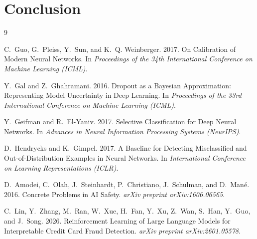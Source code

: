 \documentclass[sigconf,nonacm]{acmart}
\begin{document}
\section{Conclusion}


\begin{thebibliography}{9}

C.~Guo, G.~Pleiss, Y.~Sun, and K.~Q. Weinberger. 2017.
On Calibration of Modern Neural Networks.
In \textit{Proceedings of the 34th International Conference on Machine Learning (ICML)}.

Y.~Gal and Z.~Ghahramani. 2016.
Dropout as a Bayesian Approximation: Representing Model Uncertainty in Deep Learning.
In \textit{Proceedings of the 33rd International Conference on Machine Learning (ICML)}.

Y.~Geifman and R.~El-Yaniv. 2017.
Selective Classification for Deep Neural Networks.
In \textit{Advances in Neural Information Processing Systems (NeurIPS)}.

D.~Hendrycks and K.~Gimpel. 2017.
A Baseline for Detecting Misclassified and Out-of-Distribution Examples in Neural Networks.
In \textit{International Conference on Learning Representations (ICLR)}.

D.~Amodei, C.~Olah, J.~Steinhardt, P.~Christiano, J.~Schulman, and D.~Man{\'e}. 2016.
Concrete Problems in AI Safety.
\textit{arXiv preprint arXiv:1606.06565}.

C.~Lin, Y.~Zhang, M.~Ran, W.~Xue, H.~Fan, Y.~Xu, Z.~Wan, S.~Han, Y.~Guo, and J.~Song. 2026.
Reinforcement Learning of Large Language Models for Interpretable Credit Card Fraud Detection.
\textit{arXiv preprint arXiv:2601.05578}.

\end{thebibliography}
\end{document}
